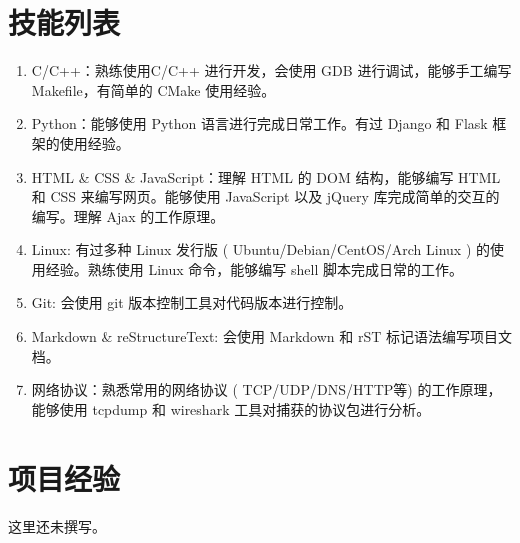 \documentclass[a4paper, UTF8]{ctexart}
\begin{document}
\section{技能列表}
\begin{enumerate}
\item C/C++：熟练使用C/C++ 进行开发，会使用 GDB 进行调试，能够手工编写 Makefile，有简单的 CMake 使用经验。
\item Python：能够使用 Python 语言进行完成日常工作。有过 Django 和 Flask 框架的使用经验。
\item HTML \& CSS \& JavaScript：理解 HTML 的 DOM 结构，能够编写 HTML 和 CSS 来编写网页。能够使用 JavaScript 以及 jQuery 库完成简单的交互的编写。理解 Ajax 的工作原理。
\item Linux: 有过多种 Linux 发行版 ( Ubuntu/Debian/CentOS/Arch Linux ) 的使用经验。熟练使用 Linux 命令，能够编写 shell 脚本完成日常的工作。
\item Git: 会使用 git 版本控制工具对代码版本进行控制。
\item Markdown \& reStructureText: 会使用 Markdown 和 rST 标记语法编写项目文档。
\item 网络协议：熟悉常用的网络协议 ( TCP/UDP/DNS/HTTP等) 的工作原理，能够使用 tcpdump 和 wireshark 工具对捕获的协议包进行分析。
\end{enumerate}

\section{项目经验}
这里还未撰写。
\end{document}
